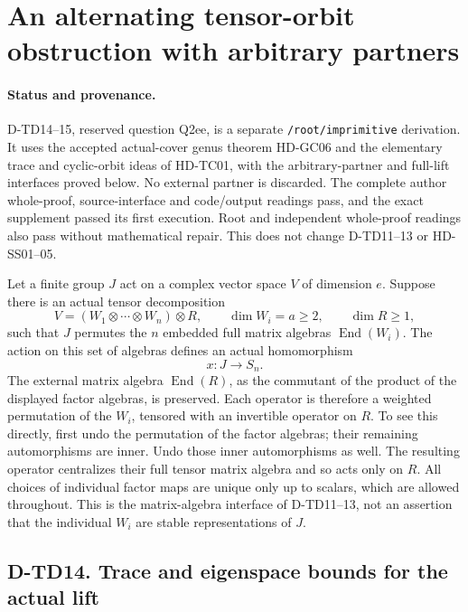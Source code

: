 \section{An alternating tensor-orbit obstruction with arbitrary partners}
\label{sec:alternating-tensor-orbit}

\paragraph{Status and provenance.}
D-TD14--15, reserved question Q2ee, is a separate
\texttt{/root/imprimitive} derivation. It uses the accepted actual-cover
genus theorem HD-GC06 and the elementary trace and cyclic-orbit ideas
of HD-TC01, with the arbitrary-partner and full-lift interfaces proved
below. No external partner is discarded. The complete author whole-proof,
source-interface and code/output readings pass, and the exact supplement
passed its first execution. Root and independent whole-proof readings also pass without mathematical repair.
This does not change D-TD11--13 or HD-SS01--05.

Let a finite group \(J\) act on a complex vector space \(V\) of dimension
\(e\). Suppose there is an actual tensor decomposition
\[
 V=(W_1\otimes\cdots\otimes W_n)\otimes R,\qquad
 \dim W_i=a\ge2,\qquad \dim R\ge1,
 \tag{TO.1}
\]
such that \(J\) permutes the \(n\) embedded full matrix algebras
\(\operatorname{End}(W_i)\). The action on this set of algebras defines
an actual homomorphism
\[
                 x:J\longrightarrow S_n.
 \tag{TO.2}
\]
The external matrix algebra \(\operatorname{End}(R)\), as the
commutant of the product of the displayed factor algebras, is preserved.
Each operator is therefore a weighted permutation of the \(W_i\),
tensored with an invertible operator on \(R\). To see this directly,
first undo the permutation of the factor algebras; their remaining
automorphisms are inner. Undo those inner automorphisms as well.
The resulting operator centralizes their full tensor matrix algebra
and so acts only on \(R\). All choices of individual factor maps
are unique only up to scalars, which are allowed throughout.
This is the matrix-algebra interface of D-TD11--13, not an assertion
that the individual \(W_i\) are stable representations of \(J\).

\subsection*{D-TD14. Trace and eigenspace bounds for the actual lift}

